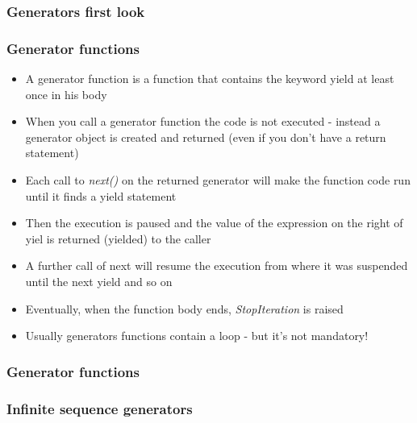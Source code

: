 \documentclass[9pt]{beamer}
\begin{document}
\begin{frame}
  \frametitle{Generators first look}
  
\end{frame}


\begin{frame}
  \frametitle{Generator functions}
  
  \begin{itemize}
    \item A \alert{generator function} is a function that contains the keyword \alert{yield} at
          least once in his body
    \item When you call a generator function the code is not executed - instead
          a generator object is created and returned (even if you don't have a return statement)
    \item Each call to \emph{next()} on the returned generator will make the function code 
          run until it finds a yield statement
    \item Then the execution is paused and the value of the expression on the right 
          of yiel is returned (yielded) to the caller
    \item A further call of next will resume the execution from where it was suspended
          until the next yield and so on
    \item Eventually, when the function body ends, \emph{StopIteration} is raised
    \item Usually generators functions contain a loop - but it's not mandatory!
  \end{itemize}
  
\end{frame}


\begin{frame}
  \frametitle{Generator functions}
  
\end{frame}


\begin{frame}
  \frametitle{Infinite sequence generators}
  
\end{frame}
\end{document}
